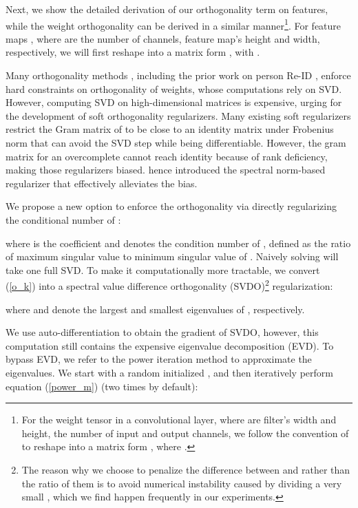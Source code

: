 \documentclass[10pt,twocolumn]{article}
\begin{document}
Next, we show the detailed derivation of our orthogonality term on features, while the weight orthogonality can be derived in a similar manner\footnote{For the weight tensor  in a convolutional layer, where  are filter's width and height, the number of input and output channels, we follow the convention of \cite{Xie_2017,bansal2018can} to reshape  into a matrix form , where . }. For feature maps , where  are the number of channels, feature map's height and width, respectively, we will first reshape  into a matrix form , with . 








Many orthogonality methods  \cite{DBLP:journals/corr/abs-1102-1523,harandi2016generalized,ozay2016optimization,huang2017orthogonal}, including the prior work on person Re-ID \cite{Sun_2017}, enforce hard constraints on orthogonality of weights, whose computations rely on SVD. However, computing SVD on high-dimensional matrices is expensive, urging for the development of soft orthogonality regularizers. Many existing soft regularizers \cite{Xie_2017,xu2019learning} restrict the Gram matrix of  to be close to an identity matrix under Frobenius norm that can avoid the SVD step while being differentiable. However, the gram matrix for an overcomplete  cannot reach identity because of rank deficiency, making those regularizers biased. \cite{bansal2018can} hence introduced the spectral norm-based regularizer that effectively alleviates the bias.

We propose a new option to enforce the orthogonality via  directly regularizing the conditional number of :

where  is the coefficient and  denotes the condition number of , defined as the ratio of maximum singular value to minimum singular value of . Naively solving  will take one full SVD. To make it computationally more tractable, we convert (\ref{o_k}) into a spectral value difference orthogonality (SVDO)\footnote{The reason why we choose to penalize the difference between  and  rather than the ratio of them is to avoid numerical instability caused by dividing a very small , which we find happen frequently in our experiments.} regularization:

where  and  denote the largest and smallest eigenvalues of , respectively. 



We use auto-differentiation to obtain the gradient of SVDO, however, this computation still contains the expensive eigenvalue decomposition (EVD). To bypass EVD, we refer to the power iteration method to approximate the eigenvalues. We start with a random initialized , and then iteratively perform equation (\ref{power_m}) (two times by default):
\end{document}
